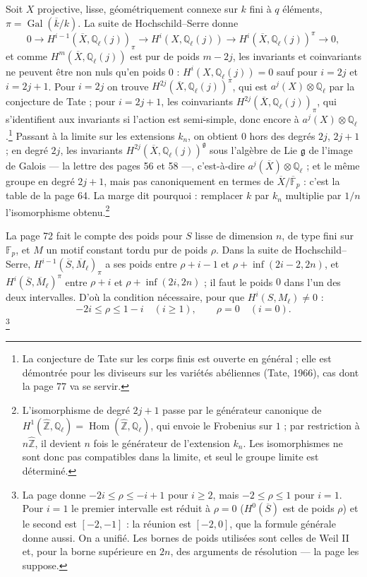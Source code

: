 \documentclass[11pt,a4paper]{article}
\begin{document}
Soit $X$ projective, lisse, géométriquement connexe sur $k$ fini à $q$ éléments,
$\pi = \operatorname{Gal}(\overline{k}/k)$. La suite de Hochschild--Serre donne
\[
0 \to H^{i-1}(\overline{X}, \mathbb{Q}_{\ell}(j))_{\pi} \to H^{i}(X, \mathbb{Q}_{\ell}(j))
\to H^{i}(\overline{X}, \mathbb{Q}_{\ell}(j))^{\pi} \to 0 ,
\]
et comme $H^{m}(\overline{X}, \mathbb{Q}_{\ell}(j))$ est pur de poids $m - 2j$, les
invariants et coinvariants ne peuvent être non nuls qu'en poids $0$ : $H^{i}(X,
\mathbb{Q}_{\ell}(j)) = 0$ sauf pour $i = 2j$ et $i = 2j+1$. Pour $i = 2j$ on trouve
$H^{2j}(\overline{X}, \mathbb{Q}_{\ell}(j))^{\pi}$, qui est $a^{j}(X) \otimes
\mathbb{Q}_{\ell}$ par la conjecture de Tate ; pour $i = 2j+1$, les coinvariants
$H^{2j}(\overline{X}, \mathbb{Q}_{\ell}(j))_{\pi}$, qui s'identifient aux invariants
si l'action est semi-simple, donc encore à $a^{j}(X) \otimes
\mathbb{Q}_{\ell}$.\footnote{La conjecture de Tate sur les corps finis est ouverte
en général ; elle est démontrée pour les diviseurs sur les variétés abéliennes
(Tate, 1966), cas dont la page 77 va se servir.} Passant à la limite sur les
extensions $k_{n}$, on obtient $0$ hors des degrés $2j$, $2j+1$ ; en degré $2j$,
les invariants $H^{2j}(\overline{X}, \mathbb{Q}_{\ell}(j))^{\mathfrak{g}}$ sous
l'algèbre de Lie $\mathfrak{g}$ de l'image de Galois --- la lettre des pages 56
et 58 ---, c'est-à-dire $a^{j}(\overline{X}) \otimes \mathbb{Q}_{\ell}$ ; et le
même groupe en degré $2j+1$, mais pas canoniquement en termes de
$\overline{X}/\overline{\mathbb{F}}_{p}$ : c'est la table de la page 64. La marge
dit pourquoi : remplacer $k$ par $k_{n}$ multiplie par $1/n$ l'isomorphisme
obtenu.\footnote{L'isomorphisme de degré $2j+1$ passe par le générateur
canonique de $H^{1}(\hat{\mathbb{Z}}, \mathbb{Q}_{\ell}) = \operatorname{Hom}(
\hat{\mathbb{Z}}, \mathbb{Q}_{\ell})$, qui envoie le Frobenius sur $1$ ; par
restriction à $n\hat{\mathbb{Z}}$, il devient $n$ fois le générateur de
l'extension $k_{n}$. Les isomorphismes ne sont donc pas compatibles dans la
limite, et seul le groupe limite est déterminé.}

La page 72 fait le compte des poids pour $S$ lisse de dimension $n$, de type
fini sur $\mathbb{F}_{p}$, et $M$ un motif constant tordu pur de poids $\rho$. Dans la suite de
Hochschild--Serre, $H^{i-1}(\overline{S}, \overline{M}_{\ell})_{\pi}$ a ses poids
entre $\rho + i - 1$ et $\rho + \inf(2i-2, 2n)$, et $H^{i}(\overline{S},
\overline{M}_{\ell})^{\pi}$ entre $\rho + i$ et $\rho + \inf(2i, 2n)$ ; il faut le
poids $0$ dans l'un des deux intervalles. D'où la condition nécessaire, pour que
$H^{i}(S, M_{\ell}) \neq 0$ :
\[
-2i \leqslant \rho \leqslant 1 - i \quad (i \geqslant 1) ,
\qquad
\rho = 0 \quad (i = 0) .
\]\footnote{La page donne $-2i \leqslant \rho \leqslant -i+1$ pour $i \geqslant 2$,
mais $-2 \leqslant \rho \leqslant 1$ pour $i = 1$. Pour $i = 1$ le premier intervalle
est réduit à $\rho = 0$ ($H^{0}(\overline{S})$ est de poids $\rho$) et le second est
$[-2, -1]$ : la réunion est $[-2, 0]$, que la formule générale donne aussi. On a
unifié. Les bornes de poids utilisées sont celles de Weil II et, pour la borne
supérieure en $2n$, des arguments de résolution --- la page les suppose.}
\end{document}
